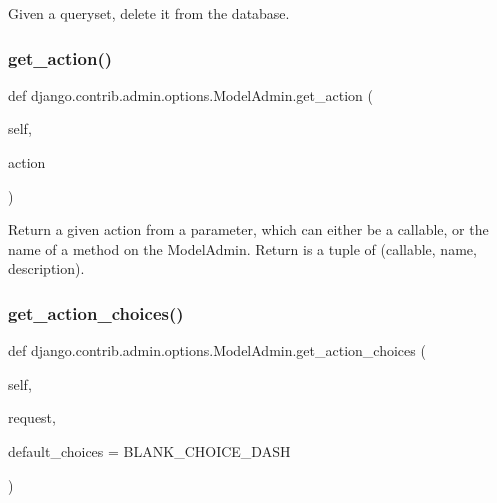 \begin{DoxyVerb}Given a queryset, delete it from the database.\end{DoxyVerb}
 \mbox{\label{classdjango_1_1contrib_1_1admin_1_1options_1_1_model_admin_a05404ec2d84db4077177ae2b774e14f7}} 
\subsubsection{\texorpdfstring{get\+\_\+action()}{get\_action()}}
{\footnotesize\ttfamily def django.\+contrib.\+admin.\+options.\+Model\+Admin.\+get\+\_\+action (\begin{DoxyParamCaption}\item[{}]{self,  }\item[{}]{action }\end{DoxyParamCaption})}

\begin{DoxyVerb}Return a given action from a parameter, which can either be a callable,
or the name of a method on the ModelAdmin.  Return is a tuple of
(callable, name, description).
\end{DoxyVerb}
 \mbox{\label{classdjango_1_1contrib_1_1admin_1_1options_1_1_model_admin_a258bcfa129d648c16350eb834599619e}} 
\subsubsection{\texorpdfstring{get\+\_\+action\+\_\+choices()}{get\_action\_choices()}}
{\footnotesize\ttfamily def django.\+contrib.\+admin.\+options.\+Model\+Admin.\+get\+\_\+action\+\_\+choices (\begin{DoxyParamCaption}\item[{}]{self,  }\item[{}]{request,  }\item[{}]{default\+\_\+choices = {\ttfamily BLANK\+\_\+CHOICE\+\_\+DASH} }\end{DoxyParamCaption})}

